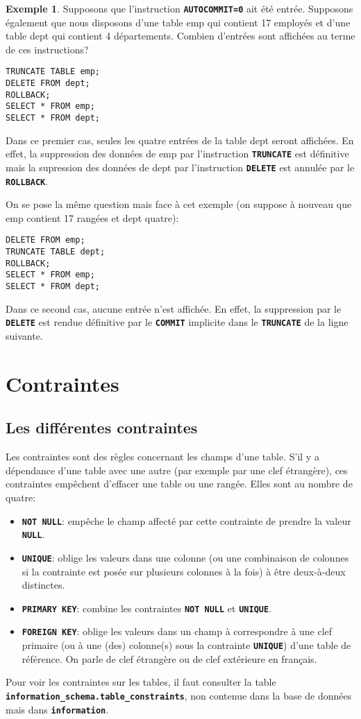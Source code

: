 \documentclass[a4paper, 12pt]{report}
\newcommand{\textSQL}[1]{\texttt{\textbf{#1}}}
\theoremstyle{definition} \newtheorem{ex}{Exemple}
\begin{document}
\begin{ex}
Supposons que l'instruction \textSQL{AUTOCOMMIT=0} ait été entrée. Supposons également que nous disposons d'une table emp qui contient 17 employés et d'une table dept qui contient 4 départements. Combien d'entrées sont affichées au terme de ces instructions?
\begin{lstlisting}[frame=single]
TRUNCATE TABLE emp;
DELETE FROM dept;
ROLLBACK;
SELECT * FROM emp;
SELECT * FROM dept;
\end{lstlisting}
Dans ce premier cas, seules les quatre entrées de la table dept seront affichées. En effet, la suppression des données de emp par l'instruction \textSQL{TRUNCATE} est définitive mais la supression des données de dept par l'instruction \textSQL{DELETE} est annulée par le \textSQL{ROLLBACK}.

On se pose la même question mais face à cet exemple (on suppose à nouveau que emp contient 17 rangées et dept quatre):
\begin{lstlisting}[frame=single]
DELETE FROM emp;
TRUNCATE TABLE dept;
ROLLBACK;
SELECT * FROM emp;
SELECT * FROM dept;
\end{lstlisting}
Dans ce second cas, aucune entrée n'est affichée. En effet, la suppression par le \textSQL{DELETE} est rendue définitive par le \textSQL{COMMIT} implicite dans le \textSQL{TRUNCATE} de la ligne suivante.
\end{ex}
\chapter{Contraintes}

\section{Les différentes contraintes}
Les contraintes sont des règles concernant les champs d'une table. S'il y a dépendance d'une table avec une autre (par exemple par une clef étrangère), ces contraintes empêchent d'effacer une table ou une rangée. Elles sont au nombre de quatre:
\begin{itemize}
  \item \textSQL{NOT NULL}: empêche le champ affecté par cette contrainte de prendre la valeur \textSQL{NULL}.
	\item \textSQL{UNIQUE}: oblige les valeurs dans une colonne (ou une combinaison de colonnes si la contrainte est posée sur plusieurs colonnes à la fois) à être deux-à-deux distinctes.
	\item \textSQL{PRIMARY KEY}: combine les contraintes \textSQL{NOT NULL} et \textSQL{UNIQUE}.
	\item \textSQL{FOREIGN KEY}: oblige les valeurs dans un champ à correspondre à une clef primaire (ou à une (des) colonne(s) sous la contrainte \textSQL{UNIQUE}) d'une table de référence. On parle de clef étrangère ou de clef extérieure en français.
\end{itemize}
Pour voir les contraintes sur les tables, il faut consulter la table \textSQL{information\_schema.table\_constraints}, non contenue dans la base de données mais dans \textSQL{information}.
\end{document}
